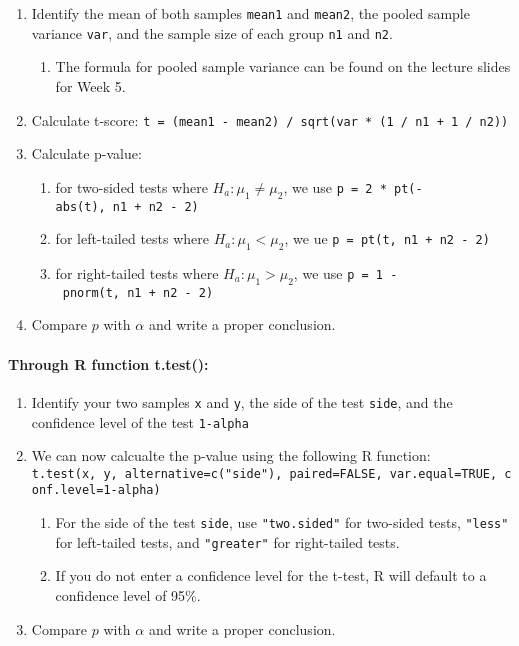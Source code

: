 \begin{enumerate}
\def\labelenumi{\arabic{enumi}.}
\item
  Identify the mean of both samples \texttt{mean1} and \texttt{mean2},
  the pooled sample variance \texttt{var}, and the sample size of each
  group \texttt{n1} and \texttt{n2}.

  \begin{enumerate}
  \def\labelenumii{\alph{enumii}.}
  \tightlist
  \item
    The formula for pooled sample variance can be found on the lecture
    slides for Week 5.
  \end{enumerate}
\item
  Calculate t-score:
  \texttt{t\ =\ (mean1\ -\ mean2)\ /\ sqrt(var\ *\ (1\ /\ n1\ +\ 1\ /\ n2))}
\item
  Calculate p-value:

  \begin{enumerate}
  \def\labelenumii{\alph{enumii}.}
  \item
    for two-sided tests where \(H_a: \mu_1 \neq \mu_2\), we use
    \texttt{p\ =\ 2\ *\ pt(-abs(t),\ n1\ +\ n2\ -\ 2)}
  \item
    for left-tailed tests where \(H_a: \mu_1 < \mu_2\), we ue
    \texttt{p\ =\ pt(t,\ n1\ +\ n2\ -\ 2)}
  \item
    for right-tailed tests where \(H_a: \mu_1 > \mu_2\), we use
    \texttt{p\ =\ 1\ -\ pnorm(t,\ n1\ +\ n2\ -\ 2)}
  \end{enumerate}
\item
  Compare \(p\) with \(\alpha\) and write a proper conclusion.
\end{enumerate}

\hypertarget{through-r-function-t.test}{%
\paragraph{Through R function
t.test():}\label{through-r-function-t.test}}

\begin{enumerate}
\def\labelenumi{\arabic{enumi}.}
\item
  Identify your two samples \texttt{x} and \texttt{y}, the side of the
  test \texttt{side}, and the confidence level of the test
  \texttt{1-alpha}
\item
  We can now calcualte the p-value using the following R function:
  \texttt{t.test(x,\ y,\ alternative=c("side"),\ paired=FALSE,\ var.equal=TRUE,\ conf.level=1-alpha)}

  \begin{enumerate}
  \def\labelenumii{\alph{enumii}.}
  \item
    For the side of the test \texttt{side}, use \texttt{"two.sided"} for
    two-sided tests, \texttt{"less"} for left-tailed tests, and
    \texttt{"greater"} for right-tailed tests.
  \item
    If you do not enter a confidence level for the t-test, R will
    default to a confidence level of 95\%.
  \end{enumerate}
\item
  Compare \(p\) with \(\alpha\) and write a proper conclusion.
\end{enumerate}

